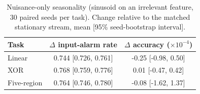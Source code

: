 \begin{table}[t]
\centering
\caption{Nuisance-only seasonality (sinusoid on an irrelevant feature, 30 paired seeds per task). Change relative to the matched stationary stream, mean [95\% seed-bootstrap interval].}
\label{tab:seasonal}
\setlength{\tabcolsep}{4pt}
\begin{tabular}{lcc}
\toprule
Task & $\Delta$ input-alarm rate & $\Delta$ accuracy ($\times10^{-4}$) \\
\midrule
Linear & 0.744 [0.726, 0.761] & -0.25 [-0.98, 0.50] \\
XOR & 0.768 [0.759, 0.776] & 0.01 [-0.47, 0.42] \\
Five-region & 0.764 [0.746, 0.780] & -0.08 [-1.62, 1.37] \\
\bottomrule
\end{tabular}
\end{table}

